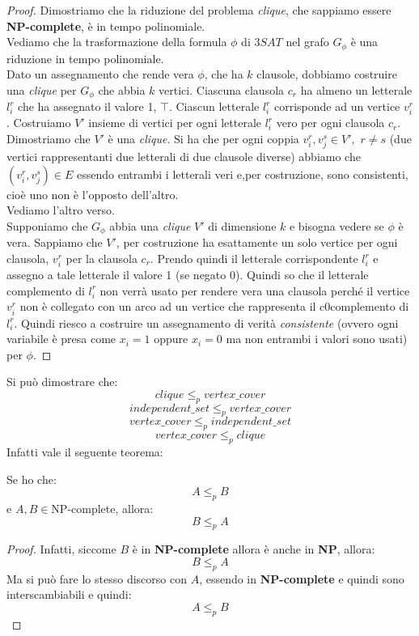\begin{proof}
  Dimostriamo che la riduzione del problema \textit{clique}, che sappiamo essere
  \textbf{NP-complete}, è in tempo polinomiale.\\ 
  Vediamo che la trasformazione della formula $\phi$ di $3SAT$ nel grafo
  $G_\phi$ è una riduzione in tempo polinomiale.\\
  Dato un assegnamento che rende vera $\phi$, che ha $k$ clausole, dobbiamo
  costruire una \textit{clique} per $G_\phi$ che abbia $k$ vertici. Ciascuna
  clausola $c_{r}$ ha almeno un letterale $l_{i}^r$ che ha assegnato il valore 1,
  $\top$. Ciascun letterale $l_{i}^r$ corrisponde ad un vertice
  $v_{i}^r$. Costruiamo $V'$ insieme di vertici per ogni letterale $l_i^r$ vero
  per ogni clausola $c_r$. Dimostriamo che $V'$ è una \textit{clique}. Si ha che
  per ogni coppia $v_i^r,v_j^s\in V',\,\,r\neq s$ (due vertici rappresentanti
  due letterali di due clausole diverse) abbiamo che $(v_i^r,v_j^s)\in
  E$ essendo entrambi i letterali veri e,per costruzione, sono consistenti, cioè
  uno non è l'opposto dell'altro.\\
  Vediamo l'altro verso.\\
  Supponiamo che $G_\phi$ abbia una \textit{clique} $V'$ di dimensione $k$ e
  bisogna vedere se $\phi$ è vera. Sappiamo che $V'$, per costruzione ha
  esattamente un solo vertice per ogni clausola, $v_i^r$ per la clausola
  $c_r$. Prendo quindi il letterale corrispondente $l_i^r$ e assegno a tale
  letterale il valore 1 (se negato 0). Quindi so che il letterale complemento di
  $l_i^r$ non verrà usato per rendere vera una clausola perché il vertice
  $v_i^r$ non è collegato con un arco ad un vertice che rappresenta il
  c0complemento di $l_i^r$. Quindi riesco a costruire un assegnamento di verità
  \textit{consistente} (ovvero ogni variabile è presa come $x_i=1$ oppure
  $x_i=0$ ma non entrambi i valori sono usati) per $\phi$.
\end{proof}
Si può dimostrare che:
\[clique\leq_p vertex\_cover\]
\[independent\_set\leq_p vertex\_cover\]
\[vertex\_cover\leq_p independent\_set\]
\[vertex\_cover\leq_p clique\]
Infatti vale il seguente teorema:
\begin{teorema}
  Se ho che:
  \[A\leq_p B\]
  e $A,B\in \mbox{NP-complete}$, allora:
  \[B\leq_p A\]
\end{teorema}
\begin{proof}
    Infatti, siccome $B$ è in \textbf{NP-complete} allora è anche in \textbf{NP},
  allora: 
  \[B\leq_p A\]
  Ma si può fare lo stesso discorso con $A$, essendo in \textbf{NP-complete} e
  quindi sono interscambiabili e quindi:
  \[A\leq_p B\]
\end{proof}
